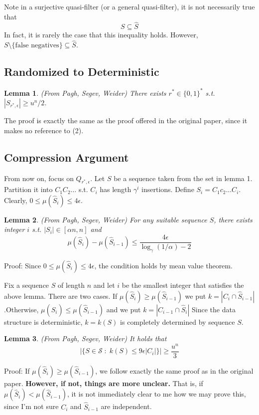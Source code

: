 \documentclass{article}
\newtheorem{lemma}{Lemma}[section]
\begin{document}
Note in a surjective quasi-filter (or a general quasi-filter), it is not necessarily true that
\begin{equation}
S \subseteq \hat{S}
\end{equation}
In fact, it is rarely the case that this inequality holds. However, $S \setminus \{\text{false negatives}\} \subseteq \hat{S}$.

\subsection{Randomized to Deterministic}
\begin{lemma}
(From Pagh, Segev, Weider) There exists $r^* \in \{0,1\}^*$ s.t. $|S_{r^*,\epsilon}| \geqslant u^n/2$.
\end{lemma}
The proof is exactly the same as the proof offered in the original paper, since it makes no reference to (2).

\subsection{Compression Argument}
From now on, focus on $Q_{r^*,\epsilon}$. Let $S$ be a sequence taken from the set in lemma 1. Partition it into $C_1C_2\dots$ s.t. $C_i$ has length $\gamma^i$ insertions. Define $S_i = C_1c_2\dots C_i$. Clearly, $0 \leqslant \mu(\hat{S}_i) \leqslant 4\epsilon$.

\begin{lemma}
(From Pagh, Segev, Weider) For any suitable sequence $S$, there exists integer $i$ s.t. $|S_i| \in [\alpha n,n]$ and
$$\mu(\hat{S}_i) - \mu(\hat{S}_{i-1}) \leqslant \frac{4\epsilon}{\log_\gamma(1/\alpha)-2}$$
\end{lemma}
Proof: Since $0 \leqslant \mu(\hat{S}_i) \leqslant 4\epsilon$, the condition holds by mean value theorem.

Fix a sequence $S$ of length $n$ and let $i$ be the smallest integer that satisfies the above lemma.
There are two cases. If $\mu(\hat{S}_i) \geqslant \mu(\hat{S}_{i-1})$ we put $k = |C_i \cap \hat{S}_{i-1}|$.Otherwise, $\mu(\hat{S}_i) \leqslant \mu(\hat{S}_{i-1})$ and we put $k = |C_{i-1} \cap \hat{S}_{i}|$ Since the data structure is deterministic, $k = k(S)$ is completely determined by sequence $S$.

\begin{lemma}
(From Pagh, Segev, Weider) It holds that
\begin{equation}
|\{S \in \mathcal{S} \;:\; k(S) \leqslant 9\epsilon|C_i|\}| \geqslant \frac{u^n}{3}
\end{equation}
\end{lemma}
Proof: If $\mu(\hat{S}_i) \geqslant \mu(\hat{S}_{i-1})$, we follow exactly the same proof as in the original paper. \textbf{However, if not, things are more unclear.} That is, if $\mu(\hat{S}_i) < \mu(\hat{S}_{i-1})$, it is not immediately clear to me how we may prove this, since I'm not sure $C_i$ and $\hat{S}_{i-1}$ are independent.
\end{document}
